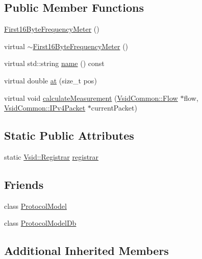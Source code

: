 \subsection*{Public Member Functions}
\begin{DoxyCompactItemize}
\item 
\hyperlink{class_vsid_1_1_first16_byte_frequency_meter_ab6b36c8c93e261603e324386c5dc21b9}{First16\-Byte\-Frequency\-Meter} ()
\item 
virtual \hyperlink{class_vsid_1_1_first16_byte_frequency_meter_a112f28ac6dbdf8d9daadb610bcd95817}{$\sim$\-First16\-Byte\-Frequency\-Meter} ()
\item 
virtual std\-::string \hyperlink{class_vsid_1_1_first16_byte_frequency_meter_a634fd6e5333e83cf5401782a449cc068}{name} () const 
\item 
virtual double \hyperlink{class_vsid_1_1_first16_byte_frequency_meter_ad34a4919ba3b5187f028423ac3ca23e3}{at} (size\-\_\-t pos)
\item 
virtual void \hyperlink{class_vsid_1_1_first16_byte_frequency_meter_aaaa9a4fb63de167e578f84ebb2907a95}{calculate\-Measurement} (\hyperlink{class_vsid_common_1_1_flow}{Vsid\-Common\-::\-Flow} $\ast$flow, \hyperlink{class_vsid_common_1_1_i_pv4_packet}{Vsid\-Common\-::\-I\-Pv4\-Packet} $\ast$current\-Packet)
\end{DoxyCompactItemize}
\subsection*{Static Public Attributes}
\begin{DoxyCompactItemize}
\item 
static \hyperlink{class_vsid_1_1_registrar}{Vsid\-::\-Registrar} \hyperlink{class_vsid_1_1_first16_byte_frequency_meter_a4555c80e7dbbc6d23ff452bc1ca70df4}{registrar}
\end{DoxyCompactItemize}
\subsection*{Friends}
\begin{DoxyCompactItemize}
\item 
class \hyperlink{class_vsid_1_1_first16_byte_frequency_meter_a80219b863d4ff3456933d16bc5f73f45}{Protocol\-Model}
\item 
class \hyperlink{class_vsid_1_1_first16_byte_frequency_meter_a3c0d389e7a9476b06313d8fb9ca9fe68}{Protocol\-Model\-Db}
\end{DoxyCompactItemize}
\subsection*{Additional Inherited Members}


